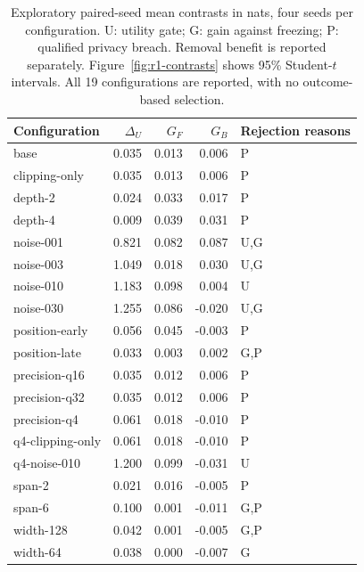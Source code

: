 \begin{table}[htbp]
\centering\small
\begin{tabular}{@{}lrrrl@{}}
\toprule
Configuration & $\Delta_U$ & $G_F$ & $G_B$ & Rejection reasons \\
\midrule
base & 0.035 & 0.013 & 0.006 & P \\
clipping-only & 0.035 & 0.013 & 0.006 & P \\
depth-2 & 0.024 & 0.033 & 0.017 & P \\
depth-4 & 0.009 & 0.039 & 0.031 & P \\
noise-001 & 0.821 & 0.082 & 0.087 & U,G \\
noise-003 & 1.049 & 0.018 & 0.030 & U,G \\
noise-010 & 1.183 & 0.098 & 0.004 & U \\
noise-030 & 1.255 & 0.086 & -0.020 & U,G \\
position-early & 0.056 & 0.045 & -0.003 & P \\
position-late & 0.033 & 0.003 & 0.002 & G,P \\
precision-q16 & 0.035 & 0.012 & 0.006 & P \\
precision-q32 & 0.035 & 0.012 & 0.006 & P \\
precision-q4 & 0.061 & 0.018 & -0.010 & P \\
q4-clipping-only & 0.061 & 0.018 & -0.010 & P \\
q4-noise-010 & 1.200 & 0.099 & -0.031 & U \\
span-2 & 0.021 & 0.016 & -0.005 & P \\
span-6 & 0.100 & 0.001 & -0.011 & G,P \\
width-128 & 0.042 & 0.001 & -0.005 & G,P \\
width-64 & 0.038 & 0.000 & -0.007 & G \\
\bottomrule
\end{tabular}
\caption{Exploratory paired-seed mean contrasts in nats, four seeds per configuration. U: utility gate; G: gain against freezing; P: qualified privacy breach. Removal benefit is reported separately. Figure~\ref{fig:r1-contrasts} shows 95\% Student-$t$ intervals. All 19 configurations are reported, with no outcome-based selection.}
\label{tab:r1-results}
\end{table}
